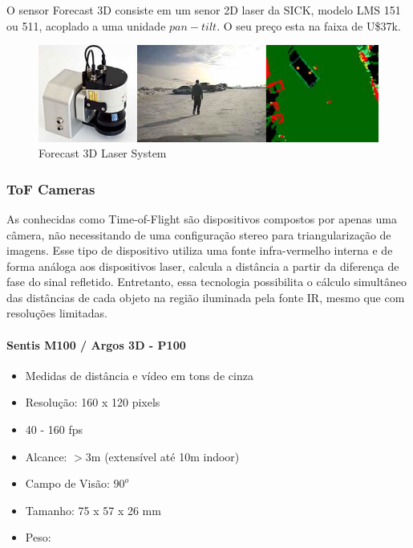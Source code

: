 O sensor Forecast 3D consiste em um senor 2D laser da SICK, modelo LMS 151 ou
511, acoplado a uma unidade $pan-tilt$. O seu preço esta na faixa de U\$37k.


\begin{figure}[h!]
   \centering
   \includegraphics[width=0.8\columnwidth]{figs/3dsensors/forecast}
   \caption{Forecast 3D Laser System}
   \label{fig::forecast}
\end{figure}



\subsubsection{ToF Cameras}

As conhecidas como Time-of-Flight são dispositivos compostos por apenas uma
câmera, não necessitando de uma configuração stereo para triangularização de
imagens. Esse tipo de dispositivo utiliza uma fonte infra-vermelho interna e de
forma análoga aos dispositivos laser, calcula a distância a partir da diferença
de fase do sinal refletido. Entretanto, essa tecnologia possibilita o cálculo
simultâneo das distâncias de cada objeto na região iluminada pela fonte IR,
mesmo que com resoluções limitadas.

\paragraph{Sentis M100 / Argos 3D - P100}

\begin{itemize}
  \item Medidas de distância e vídeo em tons de cinza
  \item Resolução: 160 x 120 pixels
  \item 40 - 160 fps
  \item Alcance: $>$3m  (extensível até 10m indoor)
  \item Campo de Visão: $90^o$
  \item Tamanho: 75 x 57 x 26 mm
  \item Peso:
\end{itemize}

